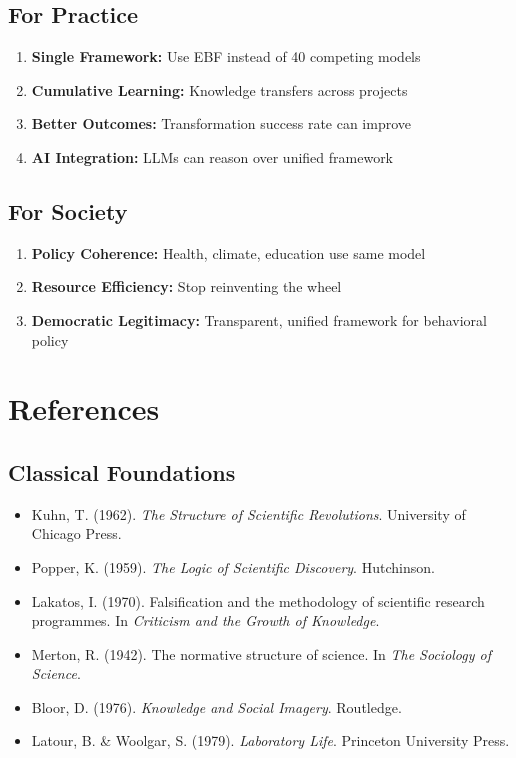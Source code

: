 \subsection{For Practice}

\begin{enumerate}
\item \textbf{Single Framework:} Use EBF instead of 40 competing models
\item \textbf{Cumulative Learning:} Knowledge transfers across projects
\item \textbf{Better Outcomes:} Transformation success rate can improve
\item \textbf{AI Integration:} LLMs can reason over unified framework
\end{enumerate}

\subsection{For Society}

\begin{enumerate}
\item \textbf{Policy Coherence:} Health, climate, education use same model
\item \textbf{Resource Efficiency:} Stop reinventing the wheel
\item \textbf{Democratic Legitimacy:} Transparent, unified framework for behavioral policy
\end{enumerate}



\section{References}
\label{sec:meta-references}

\subsection{Classical Foundations}
\begin{itemize}[nosep]
\item Kuhn, T. (1962). \textit{The Structure of Scientific Revolutions}. University of Chicago Press.
\item Popper, K. (1959). \textit{The Logic of Scientific Discovery}. Hutchinson.
\item Lakatos, I. (1970). Falsification and the methodology of scientific research programmes. In \textit{Criticism and the Growth of Knowledge}.
\item Merton, R. (1942). The normative structure of science. In \textit{The Sociology of Science}.
\item Bloor, D. (1976). \textit{Knowledge and Social Imagery}. Routledge.
\item Latour, B. \& Woolgar, S. (1979). \textit{Laboratory Life}. Princeton University Press.
\end{itemize}

